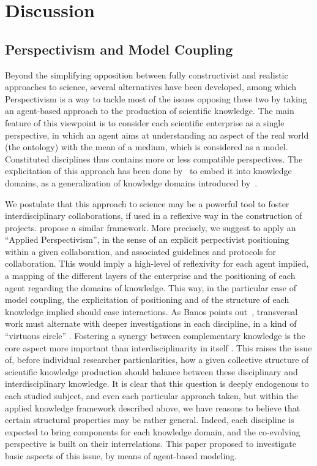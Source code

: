 \documentclass[utf8,11pt]{article}
\begin{document}
\section{Discussion}


\subsection{Perspectivism and Model Coupling}

Beyond the simplifying opposition between fully constructivist and realistic approaches to science, several alternatives have been developed, among which Perspectivism \cite{giere2010scientific} is a way to tackle most of the issues opposing these two by taking an agent-based approach to the production of scientific knowledge. The main feature of this viewpoint is to consider each scientific enterprise as a single perspective, in which an agent aims at understanding an aspect of the real world (the ontology) with the mean of a medium, which is considered as a model. Constituted disciplines thus contains more or less compatible perspectives. The explicitation of this approach has been done by~\cite{raimbault2017knowledge} to embed it into knowledge domains, as a generalization of knowledge domains introduced by~\cite{livet2010ontology}.


We postulate that this approach to science may be a powerful tool to foster interdisciplinary collaborations, if used in a reflexive way in the construction of projects. \cite{Ellemers7561} propose a similar framework. More precisely, we suggest to apply an ``Applied Perspectivism'', in the sense of an explicit perpectivist positioning within a given collaboration, and associated guidelines and protocols for collaboration. This would imply a high-level of reflexivity for each agent implied, a mapping of the different layers of the enterprise and the positioning of each agent regarding the domains of knowledge. This way, in the particular case of model coupling, the explicitation of positioning and of the structure of each knowledge implied should ease interactions. As Banos points out~\cite{banos2013pour}, transversal work must alternate with deeper investigations in each discipline, in a kind of ``virtuous circle'' \cite{banos2017knowledge}. Fostering a synergy between complementary knowledge is the core aspect more important than interdisciplinarity in itself \cite{leydesdorff2020measurement}. This raises the issue of, before individual researcher particularities, how a given collective structure of scientific knowledge production should balance between these disciplinary and interdisciplinary knowledge. It is clear that this question is deeply endogenous to each studied subject, and even each particular approach taken, but within the applied knowledge framework described above, we have reasons to believe that certain structural properties may be rather general. Indeed, each discipline is expected to bring components for each knowledge domain, and the co-evolving perspective is built on their interrelations. This paper proposed to investigate basic aspects of this issue, by means of agent-based modeling.
\end{document}
